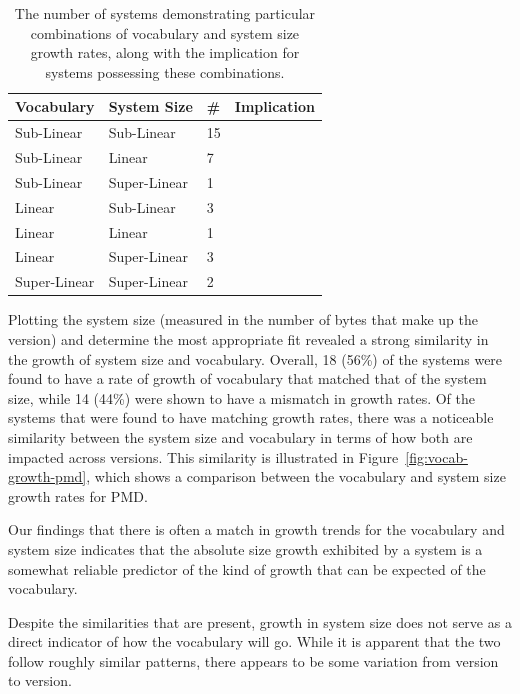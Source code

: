 \begin{table}[t]
\centering
\begin{tabular}{|p{}|p{}|p{}|p{}|}
\hline
{\bf Vocabulary} & {\bf System Size} & {\bf \#} & {\bf Implication} \\
\hline
\hline
Sub-Linear
&
Sub-Linear
&
15
&
\\
\hline
Sub-Linear
&
Linear
&
7
&
\\
\hline
Sub-Linear
&
Super-Linear
&
1
&
\\
\hline
Linear
&
Sub-Linear
&
3
&
\\
\hline
Linear
&
Linear
&
1
&
\\
\hline
Linear
&
Super-Linear
&
3
&
\\
\hline
Super-Linear
&
Super-Linear
&
2
&
\\
\hline
\end{tabular}
\vspace{0.2cm}
\caption{The number of systems demonstrating particular combinations of vocabulary and system size growth rates, along with the implication for systems possessing these combinations.}
\label{tab:growth_rate_results}
\vspace{-0.2cm}
\end{table}

Plotting the system size (measured in the number of bytes that make up the version) and determine the most appropriate fit revealed a strong similarity in the growth of system size and vocabulary. Overall, 18 (56\%) of the systems were found to have a rate of growth of vocabulary that matched that of the system size, while 14 (44\%) were shown to have a mismatch in growth rates. Of the systems that were found to have matching growth rates, there was a noticeable similarity between the system size and vocabulary in terms of how both are impacted across versions. This similarity is illustrated in Figure~\ref{fig:vocab-growth-pmd}, which shows a comparison between the vocabulary and system size growth rates for PMD.

Our findings that there is often a match in growth trends for the vocabulary and system size indicates that the absolute size growth exhibited by a system is a somewhat reliable predictor of the kind of growth that can be expected of the vocabulary.

Despite the similarities that are present, growth in system size does not serve as a direct indicator of how the vocabulary will go. While it is apparent that the two follow roughly similar patterns, there appears to be some variation from version to version.


